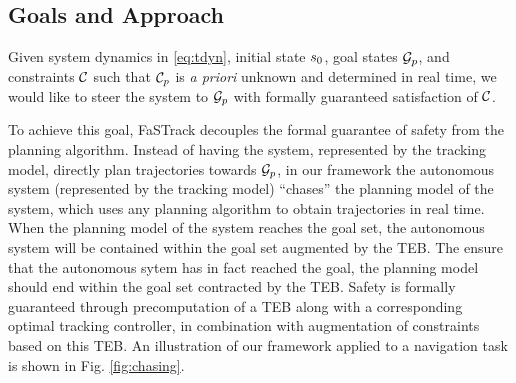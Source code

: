 
\subsection{Goals and Approach}
Given system dynamics in \eqref{eq:tdyn}, initial state $s_0$, goal states $\mathcal G_p$, and constraints $\mathcal C$ such that $\mathcal C_p$ is \textit{a priori} unknown and determined in real time, we would like to steer the system to $\mathcal G_p$ with formally guaranteed satisfaction of $\mathcal C$.

To achieve this goal, FaSTrack decouples the formal guarantee of safety from the planning algorithm.
Instead of having the system, represented by the tracking model, directly plan trajectories towards $\mathcal G_p$, in our framework the autonomous system (represented by the tracking model) ``chases'' the planning model of the system, which uses any planning algorithm to obtain trajectories in real time.
When the planning model of the system reaches the goal set, the autonomous system will be contained within the goal set augmented by the TEB. The ensure that the autonomous sytem has in fact reached the goal, the planning model should end within the goal set contracted by the TEB.
Safety is formally guaranteed through precomputation of a TEB along with a corresponding optimal tracking controller, in combination with augmentation of constraints based on this TEB.
An illustration of our framework applied to a navigation task is shown in Fig. \ref{fig:chasing}.